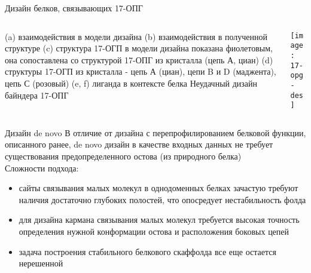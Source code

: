\begin{frame}{Дизайн белков, связывающих 17-ОПГ}
    \begin{columns}
\begin{column}{0.5\textwidth}
    (a) взаимодействия в модели дизайна
    (b) взаимодействия в полученной
    структуре
    (c) структура 17-ОГП в модели дизайна
    показана фиолетовым, она
    сопоставлена со структурой 17-ОПГ из
    кристалла (цепь А, циан)
    (d) структуры 17-ОГП из кристалла -
    цепь А (циан), цепи B и D (маджента),
    цепь С (розовый)
    (e, f) лиганда в контексте белка
    Неудачный дизайн байндера 17-ОПГ
\end{column}
\begin{column}{0.5\textwidth}
    \texttt{[image: 17-opg-des]}
\end{column}
\end{columns}
\end{frame}
    
\begin{frame}{Дизайн de novo}
    В отличие от дизайна с перепрофилированием белковой функции, описанного
ранее, de novo дизайн в качестве входных данных не требует существования
предопределенного остова (из природного белка)\\

Сложности подхода:
    \begin{itemize}
        \item   сайты связывания малых молекул в однодоменных белках зачастую
        требуют наличия достаточно глубоких полостей, что опосредует
        нестабильность фолда
        \item для дизайна кармана связывания малых молекул требуется высокая
        точность определения нужной конформации остова и расположения
        боковых цепей
      \item  \*задача построения стабильного белкового скаффолда все еще остается
        нерешенной
    \end{itemize}
   
\end{frame}


